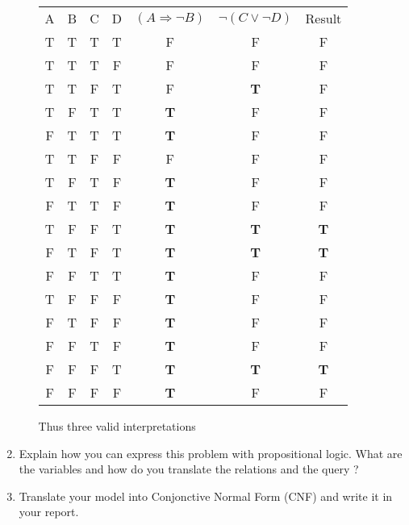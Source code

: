 \begin{enumerate}
\begin{enumerate}
\begin{framed}
    				\begin{tabular}{c|c|c|c|c|c|c}
    					A	&B	&C	&D	&$(A \Rightarrow \lnot B)$	&$\lnot(C \vee \lnot D)$ &Result\\
    					T	&T	&T	&T	&F			&F			&F\\
    					T	&T	&T	&F	&F			&F			&F\\
    					T	&T	&F	&T	&F			&\textbf{T}	&F\\
    					T	&F	&T	&T	&\textbf{T}	&F			&F\\
    					F	&T	&T	&T	&\textbf{T}	&F			&F\\
    					T	&T	&F	&F	&F			&F			&F\\
    					T	&F	&T	&F	&\textbf{T}	&F			&F\\
    					F	&T	&T	&F	&\textbf{T}	&F			&F\\
    					T	&F	&F	&T	&\textbf{T}	&\textbf{T}	&\textbf{T}\\
    					F	&T	&F	&T	&\textbf{T}	&\textbf{T}	&\textbf{T}\\
    					F	&F	&T	&T	&\textbf{T}	&F			&F\\
    					T	&F	&F	&F	&\textbf{T}	&F			&F\\
    					F	&T	&F	&F	&\textbf{T}	&F			&F\\
    					F	&F	&T	&F	&\textbf{T}	&F			&F\\
    					F	&F	&F	&T	&\textbf{T}	&\textbf{T}	&\textbf{T}\\
    					F	&F	&F	&F	&\textbf{T}	&F			&F\\
    				\end{tabular}
    				\FloatBarrier
    				\vspace{5mm}
    				Thus three valid interpretations
    			\end{framed}
    	\end{enumerate}
    	
    \item Explain how you can express this problem with propositional logic. What are the variables and how do you translate the relations and the query ? 
    	\begin{framed}
    	\end{framed}
    
    \item Translate your model into Conjonctive Normal Form (CNF) and write it in your report.
    	\begin{framed}
    	\end{framed}
    
\end{enumerate}
